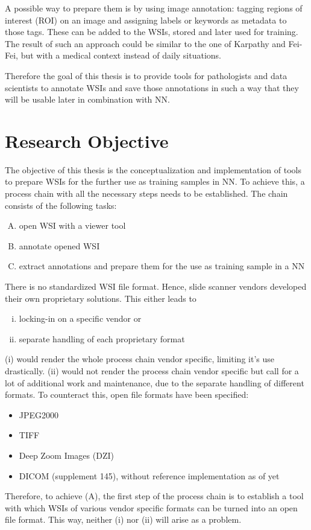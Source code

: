 A possible way to prepare them is by using image annotation: tagging regions of interest (ROI) on an image and assigning labels or keywords as metadata to those tags. These can be added to the WSIs, stored and later used for training. The result of such an approach could be similar to the one of Karpathy and Fei-Fei\cite{Karpathy15}, but with a medical context instead of daily situations.

Therefore the goal of this thesis is to provide tools for pathologists and data scientists to annotate WSIs and save those annotations in such a way that they will be usable later in combination with NN.


\section{Research Objective}
\label{sec1_researchObjective}
The objective of this thesis is the conceptualization and implementation of tools to prepare WSIs for the further use as training samples in NN. To achieve this, a process chain with all the necessary steps needs to be established. The chain consists of the following tasks:
\begin{enumerate}[(A)]
	\item open WSI with a viewer tool
	\item annotate opened WSI
	\item extract annotations and prepare them for the use as training sample in a NN
\end{enumerate}

There is no standardized WSI file format\cite{Cornish13}. Hence, slide scanner vendors developed their own proprietary solutions. This either leads to
\begin{enumerate}[(i)]
	\item locking-in on a specific vendor or
	\item separate handling of each proprietary format
\end{enumerate}
(i) would render the whole process chain vendor specific, limiting it's use drastically. (ii) would not render the process chain vendor specific but call for a lot of additional work and maintenance, due to the separate handling of different formats. To counteract this, open file formats have been specified\cite{Cornish13}:
\begin{itemize}
	\item JPEG2000
	\item TIFF
	\item Deep Zoom Images (DZI)
	\item DICOM (supplement 145), without reference implementation as of yet\cite{Cornish13}
\end{itemize}
Therefore, to achieve (A), the first step of the process chain is to establish a tool with which WSIs of various vendor specific formats can be turned into an open file format. This way, neither (i) nor (ii) will arise as a problem.

